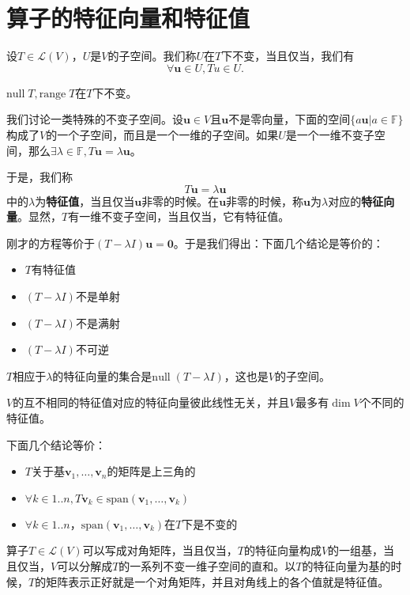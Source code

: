 \section{算子的特征向量和特征值}\label{sec:eigenvalue}

设$T\in \mathcal{L}(V)$，$U$是$V$的子空间。我们称$U$在$T$下不变，当且仅当，我们有
\[
\forall \boldsymbol{u} \in U, Tu \in U.
\]

$\mathrm{null} \; T, \mathrm{range} \; T$在$T$下不变。

我们讨论一类特殊的不变子空间。设$\boldsymbol{u} \in V$且$\boldsymbol{u}$不是零向量，下面的空间$\{a\boldsymbol{u} | a \in \mathbb{F}\}$构成了$V$的一个子空间，而且是一个一维的子空间。如果$U$是一个一维不变子空间，那么$\exists \lambda \in \mathbb{F}, T\boldsymbol{u}=\lambda \boldsymbol{u}$。

于是，我们称 \[
T\boldsymbol{u} = \lambda \boldsymbol{u} 
\]
中的$\lambda$为\textbf{特征值}，当且仅当$\boldsymbol{u}$非零的时候。在$\boldsymbol{u}$非零的时候，称$\boldsymbol{u}$为$\lambda$对应的\textbf{特征向量}。显然，$T$有一维不变子空间，当且仅当，它有特征值。

刚才的方程等价于$(T-\lambda I)\boldsymbol{u}=\boldsymbol{0}$。于是我们得出：下面几个结论是等价的：
\begin{itemize}
    \item $T$有特征值 
    \item $(T-\lambda I)$不是单射 
    \item $(T-\lambda I)$不是满射
    \item $(T-\lambda I)$不可逆
\end{itemize}

$T$相应于$\lambda$的特征向量的集合是$\mathrm{null} \; (T - \lambda I)$，这也是$V$的子空间。

$V$的互不相同的特征值对应的特征向量彼此线性无关，并且$V$最多有$\dim V$个不同的特征值。

下面几个结论等价：

\begin{itemize}
    \item $T$关于基$\boldsymbol{v}_1, \ldots, \boldsymbol{v}_n$的矩阵是上三角的
    \item $\forall k \in 1..n, T\boldsymbol{v}_k \in \mathrm{span}(\boldsymbol{v}_1, \ldots, \boldsymbol{v}_k)$
    \item $\forall k \in 1.. n$，$\mathrm{span}(\boldsymbol{v}_1, \ldots, \boldsymbol{v}_k)$在$T$下是不变的
\end{itemize}

算子$T \in \mathcal{L}(V)$可以写成对角矩阵，当且仅当，$T$的特征向量构成$V$的一组基，当且仅当，$V$可以分解成$T$的一系列不变一维子空间的直和。以$T$的特征向量为基的时候，$T$的矩阵表示正好就是一个对角矩阵，并且对角线上的各个值就是特征值。

